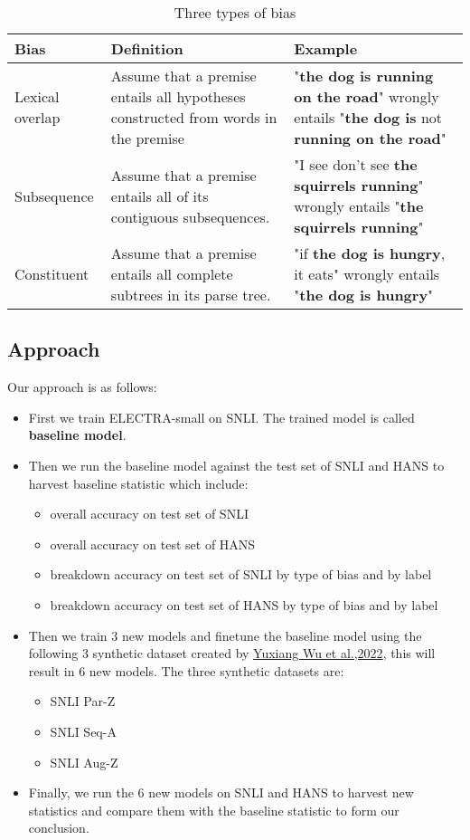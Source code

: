 \documentclass{article}
\begin{document}
\begin{table}[h]
    \label{table1}
    \caption{Three types of bias}
\centering
\begin{tabular}{p{3cm} p{5cm} p{5cm}}
\hline
\textbf{Bias}    & \textbf{Definition}    & \textbf{Example}    \\ \hline
Lexical overlap  & Assume that a premise entails all hypotheses
constructed from words in the premise  & "\textbf{the dog is running on the road}" wrongly entails "\textbf{the dog is} not \textbf{running on the road}"  \\ \hline
Subsequence  & Assume that a premise entails all of its contiguous subsequences.  & "I see don't see \textbf{the squirrels running}" wrongly entails "\textbf{the squirrels running}" \\ \hline
Constituent  & Assume that a premise entails all complete subtrees in its parse tree. & "if \textbf{the dog is hungry}, it eats" wrongly entails "\textbf{the dog is hungry}"  \\ \hline
\end{tabular}

\end{table}

\subsection{Approach}
Our approach is as follows:
\begin{itemize}
  \item First we train ELECTRA-small on SNLI. The trained model is called \textbf{baseline model}.
  \item Then we run the baseline model against the test set of SNLI and HANS to harvest baseline statistic which include:
    \begin{itemize}
      \item overall accuracy on test set of SNLI
      \item overall accuracy on test set of HANS
      \item breakdown accuracy on test set of SNLI by type of bias and by label
      \item breakdown accuracy on test set of HANS by type of bias and by label
    \end{itemize}
  \item Then we train 3 new models and finetune the baseline model using the following 3 synthetic dataset created by \hyperref[ref2]{Yuxiang Wu et al.,2022}, this will result in 6 new models. The three synthetic datasets are:
    \begin{itemize}
      \item SNLI Par-Z
      \item SNLI Seq-A
      \item SNLI Aug-Z
    \end{itemize}
  \item Finally, we run the 6 new models on SNLI and HANS to harvest new statistics and compare them with the baseline statistic to form our conclusion.
\end{itemize}
\end{document}
